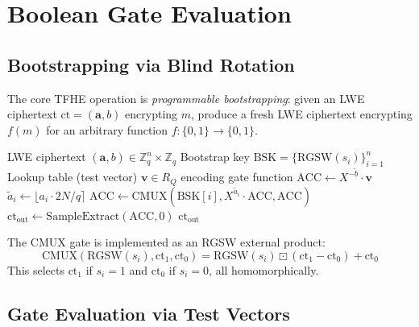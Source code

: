 \documentclass[11pt,a4paper]{article}
\begin{document}
\section{Boolean Gate Evaluation}
\label{sec:tfhe}

\subsection{Bootstrapping via Blind Rotation}

The core TFHE operation is \emph{programmable bootstrapping}: given an LWE ciphertext
$\text{ct} = (\mathbf{a}, b)$ encrypting $m$, produce a fresh LWE ciphertext encrypting
$f(m)$ for an arbitrary function $f: \{0,1\} \to \{0,1\}$.

\begin{algorithm}[H]
\caption{TFHE Blind Rotation (Bootstrapping)}
\label{alg:bootstrap}
\begin{algorithmic}[1]
\Require LWE ciphertext $(\mathbf{a}, b) \in \mathbb{Z}_q^n \times \mathbb{Z}_q$
\Require Bootstrap key $\text{BSK} = \{\text{RGSW}(s_i)\}_{i=1}^n$
\Require Lookup table (test vector) $\mathbf{v} \in R_Q$ encoding gate function
\State {}
\State $\text{ACC} \gets X^{-\tilde{b}} \cdot \mathbf{v}$ 
\State {}
\State {}
    \State $\tilde{a}_i \gets \lfloor a_i \cdot 2N/q \rceil$ 
    \State $\text{ACC} \gets \text{CMUX}(\text{BSK}[i], X^{\tilde{a}_i} \cdot \text{ACC}, \text{ACC})$
    \State {}
\EndFor
\State {}
\State $\text{ct}_{\text{out}} \gets \text{SampleExtract}(\text{ACC}, 0)$
\State \Return $\text{ct}_{\text{out}}$ 
\end{algorithmic}
\end{algorithm}

The CMUX gate is implemented as an RGSW external product:
\[
\text{CMUX}(\text{RGSW}(s_i), \text{ct}_1, \text{ct}_0) = \text{RGSW}(s_i) \boxdot (\text{ct}_1 - \text{ct}_0) + \text{ct}_0
\]
This selects $\text{ct}_1$ if $s_i = 1$ and $\text{ct}_0$ if $s_i = 0$, all homomorphically.

\subsection{Gate Evaluation via Test Vectors}
\end{document}
